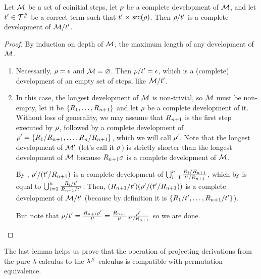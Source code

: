 \begin{lemma}
Let $\mathcal{M}$ be a set of coinitial steps,
let $\rho$ be a complete development of $\mathcal{M}$,
and let $t' \in \mathcal{T}^{\mathtt{\#}}$ be a correct term such that $t' \mathrel{\ltimes} \mathsf{src}(\rho)$.
Then $\rho/t'$ is a complete development of $\mathcal{M}/t'$.
\end{lemma}
\begin{proof}
By induction on depth of $\mathcal{M}$, \ie the maximum length of any development of $\mathcal{M}$.
\begin{enumerate}
  \item {} Necessarily, $\rho = \epsilon$ and $\mathcal{M} = \varnothing$.
    Then $\rho / t' = \epsilon$, which is a (complete) development of an empty set of steps,
    like $\mathcal{M} / t'$.
  \item {} In this case, the longest development of $\mathcal{M}$ is non-trivial, so
    $\mathcal{M}$ must be non-empty, let it be $\{R_1, \hdots, R_{n+1}\}$
    and let $\rho$ be a complete development of it.
    Without loss of generality, we may assume that $R_{n+1}$ is the first step executed by $\rho$,
    followed by a complete development of
    $\rho' = \{R_1 / R_{n+1}, \hdots, R_n / R_{n+1}\}$, which we will call $\rho'$.
    Note that the longest development of $\mathcal{M}'$ (let's call it $\sigma$) is strictly shorter
    than the longest development of $\mathcal{M}$ because $R_{n+1} \sigma$
    is a complete development of $\mathcal{M}$.

    By \ih, $\rho' / (t' / R_{n+1})$ is a complete development of
    $\bigcup_{i=1}^n \frac{R_i / R_{n+1}}{t' / R_{n+1}}$,
    which by  is equal to
    $\bigcup_{i=1}^n \frac{R_i / t'}{R_{n+1} / t'}$.
    Then, $(R_{n+1} / t') (\rho' / (t' / R_{n+1}))$ is a complete development of
    $\mathcal{M} / t'$ (because by definition it is $\{R_1 / t', \hdots, R_{n+1} / t'\}$).

    But note that
    $\rho / t' =
        \frac{R_{n+1}\rho'}{t'} =
        \frac{R_{n+1}}{t'} \frac{\rho'}{t' / R_{n+1}}$ so we are done.
\end{enumerate}
\end{proof}
\bigskip

The last lemma helps us prove that the operation of projecting derivations from the pure
$\lambda$-calculus to the $\lambda^{\mathtt{\#}}$-calculus is compatible with
permutation equivalence.

